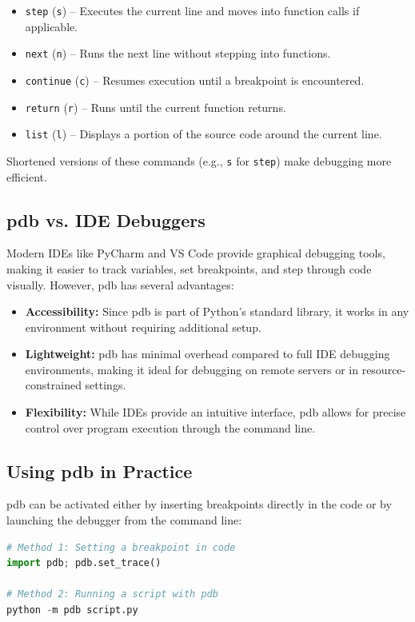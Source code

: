 \documentclass[a4paper,12pt]{article}
\begin{document}
\begin{itemize}
    \item \texttt{step} (\texttt{s}) – Executes the current line and moves into function calls if applicable.
    \item \texttt{next} (\texttt{n}) – Runs the next line without stepping into functions.
    \item \texttt{continue} (\texttt{c}) – Resumes execution until a breakpoint is encountered.
    \item \texttt{return} (\texttt{r}) – Runs until the current function returns.
    \item \texttt{list} (\texttt{l}) – Displays a portion of the source code around the current line.
\end{itemize}

Shortened versions of these commands (e.g., \texttt{s} for \texttt{step}) make debugging more efficient.

\subsection{pdb vs. IDE Debuggers}
Modern IDEs like PyCharm and VS Code provide graphical debugging tools, making it easier to track variables, set breakpoints, and step through code visually. However, pdb has several advantages:

\begin{itemize}
    \item \textbf{Accessibility:} Since pdb is part of Python’s standard library, it works in any environment without requiring additional setup.
    \item \textbf{Lightweight:} pdb has minimal overhead compared to full IDE debugging environments, making it ideal for debugging on remote servers or in resource-constrained settings.
    \item \textbf{Flexibility:} While IDEs provide an intuitive interface, pdb allows for precise control over program execution through the command line.
\end{itemize}

\subsection{Using pdb in Practice}
pdb can be activated either by inserting breakpoints directly in the code or by launching the debugger from the command line:

\begin{lstlisting}[language=Python]
# Method 1: Setting a breakpoint in code
import pdb; pdb.set_trace()

# Method 2: Running a script with pdb
python -m pdb script.py
\end{lstlisting}
\end{document}
